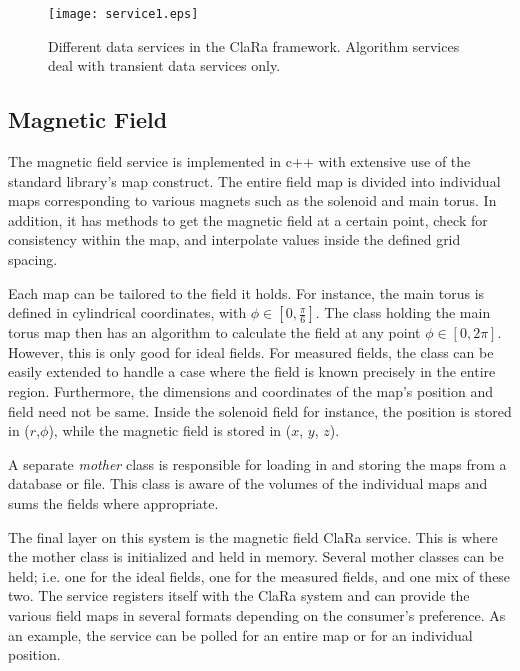 \begin{figure}[htbp]
\centering
\texttt{[image: service1.eps]} 
\caption{\small{Different data services in the ClaRa framework. Algorithm 
services deal with transient data services only.}}
\label{fig:service1}
\end{figure}

\subsection{Magnetic Field}

The magnetic field service is implemented in c++ with extensive use of 
the standard library's map construct.  The entire field map is divided 
into individual maps corresponding to various magnets such as the solenoid 
and main torus.  In addition, it has methods to get the magnetic field at 
a certain point, check for consistency within the map, and interpolate values 
inside the defined grid spacing.

Each map can be tailored to the field it holds. For instance, the main torus 
is defined in cylindrical coordinates, with $\phi\in[0,\frac{\pi}{6}]$.  The 
class holding the main torus map then has an algorithm to calculate the field 
at any point $\phi\in[0,2\pi]$.  However, this is only good for ideal fields. 
For measured fields, the class can be easily extended to handle a case where 
the field is known precisely in the entire region.  Furthermore, the 
dimensions and coordinates of the map's position and field need not be same.
Inside the solenoid field for instance, the position is stored in ($r$,$\phi$),
while the magnetic field is stored in ($x$, $y$, $z$).

A separate \emph{mother} class is responsible for loading in and storing the 
maps from a database or file. This class is aware of the volumes of the 
individual maps and sums the fields where appropriate.

The final layer on this system is the magnetic field ClaRa service. This is 
where the mother class is initialized and held in memory. Several mother 
classes can be held; i.e. one for the ideal fields, one for the measured 
fields, and one mix of these two. The service registers itself with the 
ClaRa system and can provide the various field maps in several formats 
depending on the consumer's preference.  As an example, the service can be 
polled for an entire map or for an individual position.


